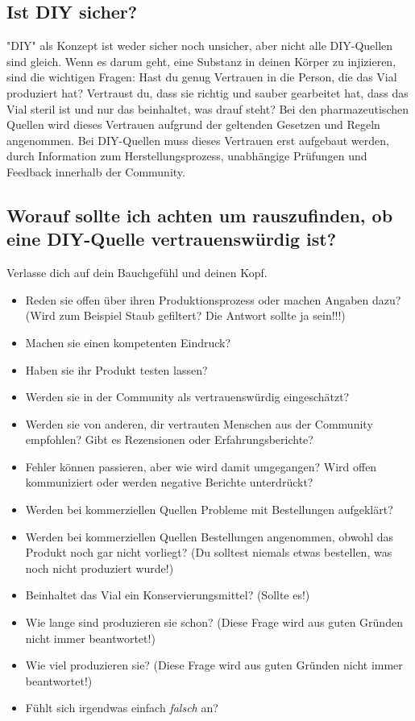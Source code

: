 \documentclass{article}
\begin{document}
\subsection{Ist DIY sicher?}

"DIY" als Konzept ist weder sicher noch unsicher, aber nicht alle DIY-Quellen sind gleich. Wenn es darum geht, eine Substanz in deinen Körper zu injizieren, sind die wichtigen Fragen: Hast du genug Vertrauen in die Person, die das Vial produziert hat? Vertraust du, dass sie richtig und sauber gearbeitet hat, dass das Vial steril ist und nur das beinhaltet, was drauf steht? Bei den pharmazeutischen Quellen wird dieses Vertrauen aufgrund der geltenden Gesetzen und Regeln angenommen. Bei DIY-Quellen muss dieses Vertrauen erst aufgebaut werden, durch Information zum Herstellungsprozess, unabhängige Prüfungen und Feedback innerhalb der Community.

\subsection{Worauf sollte ich achten um rauszufinden, ob eine DIY-Quelle vertrauenswürdig ist?}

Verlasse dich auf dein Bauchgefühl und deinen Kopf.

\begin{itemize}
  \item Reden sie offen über ihren Produktionsprozess oder machen Angaben dazu? (Wird zum Beispiel Staub gefiltert? Die Antwort sollte ja sein!!!)
  \item Machen sie einen kompetenten Eindruck?
  \item Haben sie ihr Produkt testen lassen?
  \item Werden sie in der Community als vertrauenswürdig eingeschätzt?
  \item Werden sie von anderen, dir vertrauten Menschen aus der Community empfohlen? Gibt es Rezensionen oder Erfahrungsberichte?
  \item Fehler können passieren, aber wie wird damit umgegangen? Wird offen kommuniziert oder werden negative Berichte unterdrückt?
  \item Werden bei kommerziellen Quellen Probleme mit Bestellungen aufgeklärt?
  \item Werden bei kommerziellen Quellen Bestellungen angenommen, obwohl das Produkt noch gar nicht vorliegt? (Du solltest niemals etwas bestellen, was noch nicht produziert wurde!)
  \item Beinhaltet das Vial ein Konservierungsmittel? (Sollte es!)
  \item Wie lange sind produzieren sie schon? (Diese Frage wird aus guten Gründen nicht immer beantwortet!)
  \item Wie viel produzieren sie? (Diese Frage wird aus guten Gründen nicht immer beantwortet!)
  \item Fühlt sich irgendwas einfach \textit{falsch} an?
\end{itemize}
\end{document}
